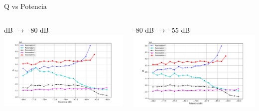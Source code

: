 \documentclass[ignorenonframetext,12pt]{beamer}
\begin{document}
\begin{frame}{Q vs Potencia}
				\begin{columns}
								\begin{column}{0.49\textwidth}
												\qquad {} dB $\to$ -80 dB
												\centering
												\includegraphics[height=0.45\textheight,width=1.1\textwidth]{Q_vs_P_tot_des}
								\end{column}
								\begin{column}{0.49\textwidth}
												-80 dB $\to$ -55 dB
												\centering
												\includegraphics[height=0.45\textheight,width=1.1\textwidth]{Q_vs_P_tot_asc}
								\end{column}
				\end{columns}

\end{frame}

\end{document}

